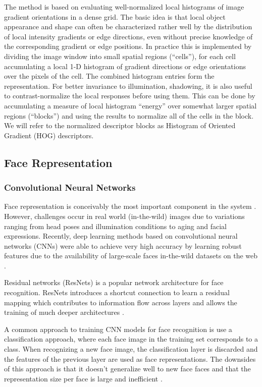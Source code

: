 \documentclass[12pt,english]{article}
\begin{document}
\quad
\cite{dalal}
The method is based on evaluating well-normalized local histograms of image gradient orientations in a dense grid. The basic idea is that local object appearance and shape can often be characterized rather well by the distribution of local intensity gradients or edge directions, even without precise knowledge of the corresponding gradient or edge positions. In practice this is implemented by dividing the image window into small spatial regions (“cells”), for each cell accumulating a local 1-D histogram of gradient directions or edge orientations over the pixels of the cell. The combined histogram entries form the representation. For better invariance to illumination, shadowing, it is also useful to contrast-normalize the local responses before using them. This can be done by accumulating a measure of local histogram “energy” over somewhat larger spatial regions (“blocks”) and using the results to normalize all of the cells in the block. We will refer to the normalized descriptor blocks as Histogram of Oriented Gradient (HOG) descriptors. 

\subsection{Face Representation}

\subsubsection{Convolutional Neural Networks}

\quad
Face representation is conceivably the most important component in the system \cite{trigueros}. However, challenges occur in real world (in-the-wild) images due to variations ranging from head poses and illumination conditions to aging and facial expressions. Recently, deep learning methods based on convolutional neural networks (CNNs) were able to achieve very high accuracy by learning robust features due to the availability of large-scale faces in-the-wild datasets on the web \cite{trigueros}. 

Residual networks (ResNets) is a popular network architecture for face recognition. ResNets introduces a shortcut connection to learn a residual mapping which contributes to information flow across layers and allows the training of much deeper architectures \cite{trigueros}.

A common approach to training CNN models for face recognition is use a classification approach, where each face image in the training set corresponds to a class. When recognizing a new face image, the classification layer is discarded and the features of the previous layer are used as face representations. The downsides of this approach is that it doesn't generalize well to new face faces and that the representation size per face is large and inefficient \cite{schroff}.
\end{document}
